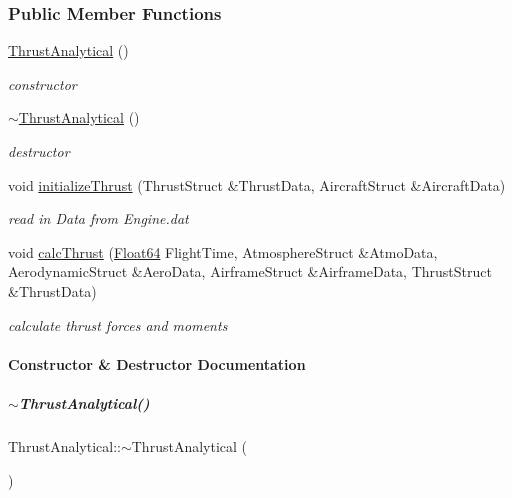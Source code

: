 \subsubsection*{Public Member Functions}
\begin{DoxyCompactItemize}
\item 
\mbox{\label{group___engine_a5c75949a22871e861090560adb2d5f18}} 
\hyperlink{group___engine_a5c75949a22871e861090560adb2d5f18}{Thrust\+Analytical} ()
\begin{DoxyCompactList}\small\item\em constructor \end{DoxyCompactList}\item 
\hyperlink{group___engine_aeaf9dd69c10812c673d6cfae0d7ca4fd}{$\sim$\+Thrust\+Analytical} ()
\begin{DoxyCompactList}\small\item\em destructor \end{DoxyCompactList}\item 
void \hyperlink{group___engine_a2bdad8d5195990b3bcb0139bc408f199}{initialize\+Thrust} (Thrust\+Struct \&Thrust\+Data, Aircraft\+Struct \&Aircraft\+Data)
\begin{DoxyCompactList}\small\item\em read in Data from Engine.\+dat \end{DoxyCompactList}\item 
void \hyperlink{group___engine_a521b775b57dc2324f09496efb8b12452}{calc\+Thrust} (\hyperlink{group___tools_ga3f1431cb9f76da10f59246d1d743dc2c}{Float64} Flight\+Time, Atmosphere\+Struct \&Atmo\+Data, Aerodynamic\+Struct \&Aero\+Data, Airframe\+Struct \&Airframe\+Data, Thrust\+Struct \&Thrust\+Data)
\begin{DoxyCompactList}\small\item\em calculate thrust forces and moments \end{DoxyCompactList}\end{DoxyCompactItemize}


\paragraph{Constructor \& Destructor Documentation}
\mbox{\label{group___engine_aeaf9dd69c10812c673d6cfae0d7ca4fd}} 
\subparagraph{\texorpdfstring{$\sim$\+Thrust\+Analytical()}{~ThrustAnalytical()}}
{\footnotesize\ttfamily Thrust\+Analytical\+::$\sim$\+Thrust\+Analytical (\begin{DoxyParamCaption}{ }\end{DoxyParamCaption})}



